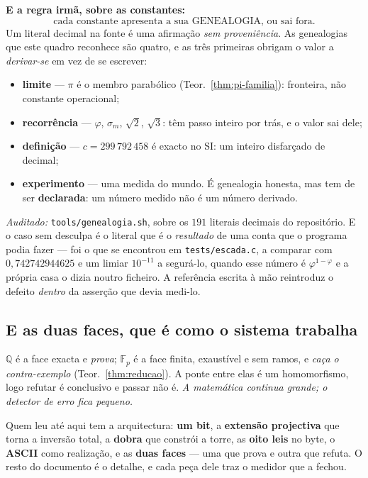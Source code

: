 \documentclass[11pt,a4paper]{article}
\newcommand{\code}[1]{\texttt{\small #1}}
\begin{document}
\medskip
\noindent\textbf{E a regra irmã, sobre as constantes:}
\[
\boxed{\;\text{cada constante apresenta a sua GENEALOGIA, ou sai fora.}\;}
\]
Um literal decimal na fonte é uma afirmação \emph{sem proveniência}. As
genealogias que este quadro reconhece são quatro, e as três primeiras
obrigam o valor a \emph{derivar-se} em vez de se escrever:
\begin{itemize}
\item \textbf{limite} --- $\pi$ é o membro parabólico
(Teor.~\ref{thm:pi-familia}): fronteira, não constante operacional;
\item \textbf{recorrência} --- $\varphi$, $\sigma_m$, $\sqrt2$, $\sqrt3$:
têm passo inteiro por trás, e o valor sai dele;
\item \textbf{definição} --- $c=299\,792\,458$ é exacto no SI: um inteiro
disfarçado de decimal;
\item \textbf{experimento} --- uma medida do mundo. É genealogia honesta,
mas tem de ser \textbf{declarada}: um número medido não é um número
derivado.
\end{itemize}
\emph{Auditado:} \code{tools/genealogia.sh}, sobre os $191$ literais
decimais do repositório. E o caso sem desculpa é o literal que é o
\emph{resultado} de uma conta que o programa podia fazer --- foi o que se
encontrou em \code{tests/escada.c}, a comparar com
$0{,}742742944625$ e um limiar $10^{-11}$ a segurá-lo, quando esse número
é $\varphi^{1-\varphi}$ e a própria casa o dizia noutro ficheiro. A
referência escrita à mão reintroduz o defeito \emph{dentro} da asserção
que devia medi-lo.

\subsection*{E as duas faces, que é como o sistema trabalha}
$\mathbb{Q}$ é a face exacta e \emph{prova}; $\mathbb{F}_p$ é a face
finita, exaustível e sem ramos, e \emph{caça o contra-exemplo}
(Teor.~\ref{thm:reducao}). A ponte entre elas é um homomorfismo, logo
refutar é conclusivo e passar não é. \emph{A matemática continua grande;
o detector de erro fica pequeno.}

\medskip
\noindent Quem leu até aqui tem a arquitectura: \textbf{um bit}, a
\textbf{extensão projectiva} que torna a inversão total, a \textbf{dobra}
que constrói a torre, as \textbf{oito leis} no byte, o \textbf{ASCII}
como realização, e as \textbf{duas faces} --- uma que prova e outra que
refuta. O resto do documento é o detalhe, e cada peça dele traz o
medidor que a fechou.
\end{document}
